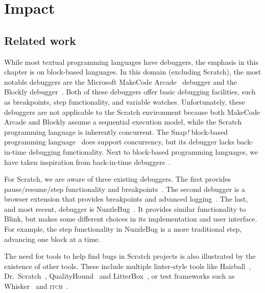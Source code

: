 \documentclass[../main]{subfiles}
\begin{document}
\section{Impact}\label{sec:blink-impact}

\subsection{Related work}\label{subsec:related-work}
While most textual programming languages have debuggers, the emphasis in this chapter is on block-based languages.
In this domain (excluding Scratch), the most notable debuggers are the Microsoft MakeCode Arcade~\autocite{ballMicrosoftMakeCodeEmbedded2019} debugger and the Blockly debugger~\autocite{savidisCompleteBlockLevelVisual2020}.
Both of these debuggers offer basic debugging facilities, such as breakpoints, step functionality, and variable watches.
Unfortunately, these debuggers are not applicable to the Scratch environment because both MakeCode Arcade and Blockly assume a sequential execution model, while the Scratch programming language is inherently concurrent.
The Snap\textit{!} block-based programming language~\autocite{monigSnapBuildYour2024} does support concurrency, but its debugger lacks back-in-time debugging functionality.
Next to block-based programming languages, we have taken inspiration from back-in-time debuggers~\autocite{barrTardisAffordableTimetravel2014,barrTimetravelDebuggingJavaScript2016}.

For Scratch, we are aware of three existing debuggers.
The first provides pause/resume/step functionality and breakpoints~\autocite{wangDevelopingResourcesDebugging2021}.
The second debugger is a browser extension that provides breakpoints and advanced logging~\autocite{ScratchAddons2023}.
The last, and most recent, debugger is NuzzleBug~\autocite{deinerNuzzleBugDebuggingBlockBased2024}.
It provides similar functionality to Blink, but makes some different choices in its implementation and user interface.
For example, the step functionality in NuzzleBug is a more traditional step, advancing one block at a time.

The need for tools to help find bugs in Scratch projects is also illustrated by the existence of other tools.
These include multiple linter-style tools like Hairball~\autocite{boeHairballLintinspiredStatic2013}, Dr.\ Scratch~\autocite{moreno-leonDrScratchWeb2015}, QualityHound~\autocite{techapalokulQualityHoundOnline2017} and LitterBox~\autocite{fraserLitterBoxLinterScratch2021}, or test frameworks such as Whisker~\autocite{stahlbauerTestingScratchPrograms2019} and \textsc{itch}~\autocite{johnsonITCHIndividualTesting2016}.
\end{document}
